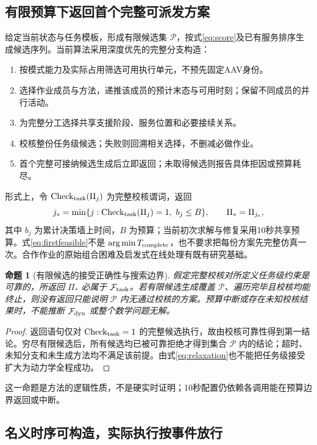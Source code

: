 \documentclass[UTF8,fontset=fandol,a4paper,11pt]{ctexart}
\newtheorem{proposition}{命题}
\begin{document}
\subsection{有限预算下返回首个完整可派发方案}

给定当前状态与任务模板，形成有限候选集 $\mathcal P$，按式\eqref{eq:score}及已有服务排序生成候选序列。当前算法采用深度优先的完整分支构造：
\begin{enumerate}[label=\arabic*.]
 \item 按模式能力及实际占用筛选可用执行单元，不预先固定AAV身份。
 \item 选择作业成员与方法，递推该成员的预计末态与可用时刻；保留不同成员的并行活动。
 \item 为完整分工选择共享支援阶段、服务位置和必要接续关系。
 \item 校核整份任务级候选；失败则回溯相关选择，不删减必做作业。
 \item 首个完整可接纳候选生成后立即返回；未取得候选则报告具体拒因或预算耗尽。
\end{enumerate}
形式上，令 $\mathrm{Check}_{\rm task}(\Pi_j)$ 为完整校核谓词，返回
\begin{equation}
 j_* =\min\{j:\mathrm{Check}_{\rm task}(\Pi_j)=1,
                    \ b_j\leq B\},\qquad \Pi_* =\Pi_{j_*},
 \label{eq:firstfeasible}
\end{equation}
其中 $b_j$ 为累计决策墙上时间，$B$ 为预算；当前初次求解与修复采用10秒共享预算。式\eqref{eq:firstfeasible}不是 $\arg\min T_{\rm complete}$，也不要求把每份方案先完整仿真一次。合作作业的原始组合困难及启发式在线处理有既有研究基础\cite{calvo}。

\begin{proposition}[有限候选的接受正确性与搜索边界]
假定完整校核对所定义任务级约束是可靠的，所返回 $\Pi_*$ 必属于 $\mathcal F_{\rm task}$。若有限候选生成覆盖 $\mathcal P$、遍历完毕且校核均能终止，则没有返回只能说明 $\mathcal P$ 内无通过校核的方案。预算中断或存在未知校核结果时，不能推断 $\mathcal F_{\rm dyn}$ 或整个数学问题无解。
\end{proposition}
\begin{proof}
返回语句仅对 $\mathrm{Check}_{\rm task}=1$ 的完整候选执行，故由校核可靠性得到第一结论。穷尽有限候选后，所有候选均已被可靠拒绝才得到集合 $\mathcal P$ 内的结论；超时、未知分支和未生成方法均不满足该前提。由式\eqref{eq:relaxation}也不能把任务级接受扩大为动力学全程成功。
\end{proof}
这一命题是方法的逻辑性质，不是硬实时证明；10秒配置仍依赖各调用能在预算边界返回或中断。

\subsection{名义时序可构造，实际执行按事件放行}
\end{document}
